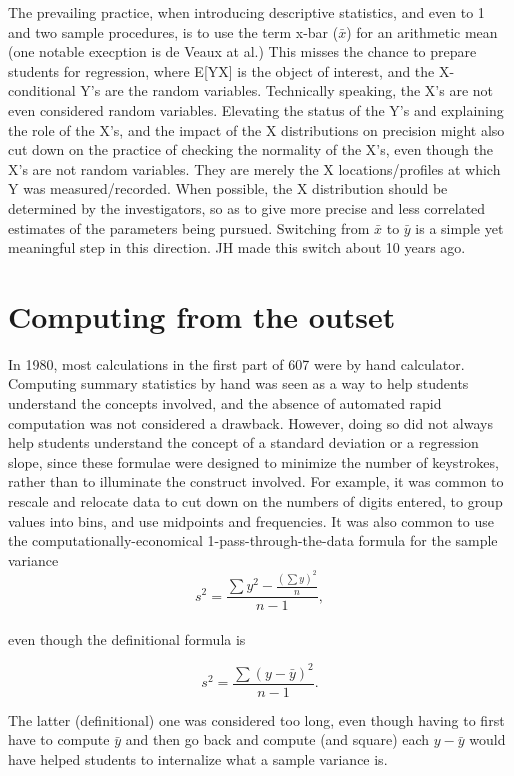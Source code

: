 \documentclass[]{book}
\begin{document}
The prevailing practice, when introducing descriptive statistics, and even to 1 and two sample procedures, is to use the term x-bar (\(\bar{x}\)) for an arithmetic mean (one notable execption is de Veaux at al.) This misses the chance to prepare students for regression, where E{[}Y\textbar{}X{]} is the object of interest, and the X-conditional Y's are the random variables. Technically speaking, the X's are not even considered random variables. Elevating the status of the Y's and explaining the role of the X's, and the impact of the X distributions on precision might also cut down on the practice of checking the normality of the X's, even though the X's are not random variables. They are merely the X locations/profiles at which Y was measured/recorded. When possible, the X distribution should be determined by the investigators, so as to give more precise and less correlated estimates of the parameters being pursued. Switching from \(\bar{x}\) to \(\bar{y}\) is a simple yet meaningful step in this direction. JH made this switch about 10 years ago.

\hypertarget{computing-from-the-outset}{%
\section{Computing from the outset}\label{computing-from-the-outset}}

In 1980, most calculations in the first part of 607 were by hand calculator. Computing summary statistics by hand was seen as a way to help students understand the concepts involved, and the absence of automated rapid computation was not considered a drawback. However,
doing so did not always help students understand the concept of a standard deviation or a regression slope, since these formulae were designed to minimize the number of keystrokes, rather than to illuminate the construct involved. For example, it was common to rescale and relocate data to cut down on the numbers of digits entered, to group values into bins, and use midpoints and frequencies. It was also common to use the computationally-economical 1-pass-through-the-data formula for the sample variance
\[s^2 =   \frac{ \sum y^2 - \frac{(\sum y)^2}{n}}{n-1},\]\\
even though the definitional formula is

\[s^2 = \frac{\sum(y - \bar{y})^2}{n-1}.\]

The latter (definitional) one was considered too long, even though having to first have to compute \(\bar{y}\) and then go back and compute (and square) each \(y - \bar{y}\) would have helped students to internalize what a sample variance is.
\end{document}
